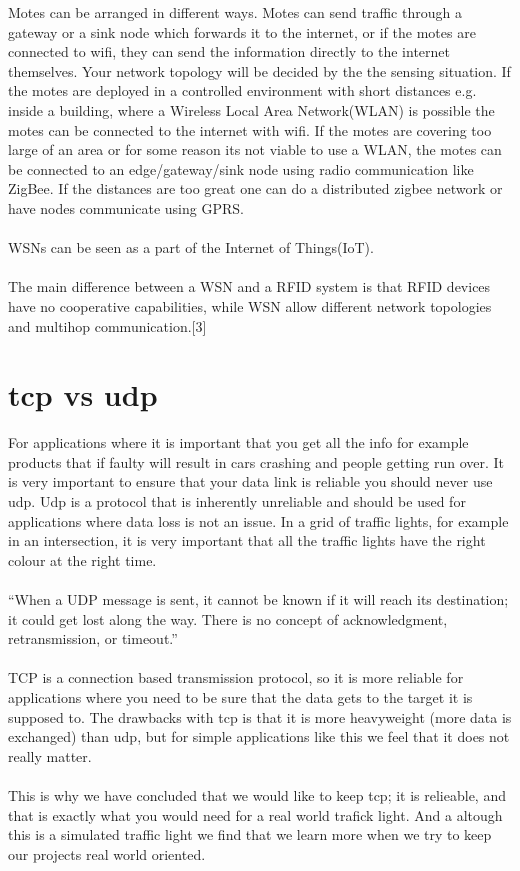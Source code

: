 \documentclass[]{uiophd}
\begin{document}
Motes can be arranged in different ways. Motes can send traffic through a gateway or a sink node which forwards it to the internet, or if the motes are connected to wifi, they can send the information directly to the internet themselves. Your network topology will be decided by the the sensing situation. If the motes are deployed in a controlled environment with short distances e.g. inside a building, where a Wireless Local Area Network(WLAN) is possible the motes can be connected to the internet with wifi. If the motes are covering too large of an area or for some reason its not viable to use a WLAN, the motes can be connected to an edge/gateway/sink node using radio communication like ZigBee. If the distances are too great one can do a distributed zigbee network or have nodes communicate using GPRS.
\\\\
WSNs can be seen as a part of the Internet of Things(IoT).
\\\\
The main difference between a WSN and a RFID system is that RFID devices have no cooperative capabilities, while WSN allow different network topologies and multihop communication.[3]
\section{tcp vs udp}
For applications where it is important that you get all the info for example products that if faulty will result in cars crashing and people getting run over. It is very important to ensure that your data link is reliable you should never use udp. Udp is a protocol that is inherently unreliable and should be used for applications where data loss is not an issue. In a grid of traffic lights, for example in an intersection, it is very important that all the traffic lights have the right colour at the right time.
\\\\
“When a UDP message is sent, it cannot be known if it will reach its destination; it could get lost along the way. There is no concept of acknowledgment, retransmission, or timeout.”
\\\\
TCP is a connection based transmission protocol, so it is more reliable for applications where you need to be sure that the data gets to the target it is supposed to. The drawbacks with tcp is that it is more heavyweight (more data is exchanged) than udp, but for simple applications like this we feel that it does not really matter.
\\\\
This is why we have concluded that we would like to keep tcp; it is relieable, and that is exactly what you would need for a real world trafick light. And a altough this is a simulated traffic light we find that we learn more when we try to keep our projects real world oriented.
\end{document}
